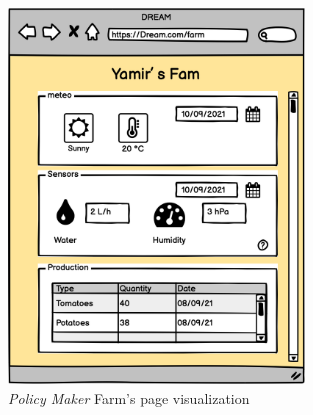 \begin{figure}[H]
    \begin{center}
    \includegraphics[width=0.7\textwidth]{mockups/PMFarm.png}
    \caption{\emph{Policy Maker} Farm's page visualization}
    \label{fig:PMFarmPage}
    \end{center}
\end{figure}

